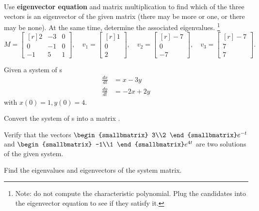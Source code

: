      \begin{question}
      Use \textbf{eigenvector equation} and matrix multiplication to find which of the three vectors is an eigenvector of the given matrix (there may be more or one, or there may be none). At the same time, determine the associated eigenvalues. \footnote{Note: do not compute the characteristic polynomial. Plug the candidates into the eigenvector equation to see if they satisfy it.}
      \begin{equation*}
      M = \begin{bmatrix*}[r]
        2 & -3 & 0 \\
        0 & -1 & 0 \\
        -1 & 5 & 1
      \end{bmatrix*},\quad
      v_{1} = \begin{bmatrix*}[r]
        1 \\ 0 \\ 2
      \end{bmatrix*}, \quad
      v_{2} = \begin{bmatrix*}[r]
        -7 \\ 0 \\ -7
      \end{bmatrix*}, \quad
      v_{3} = \begin{bmatrix*}[r]
        -7 \\ 7 \\ 7
      \end{bmatrix*}.
      \end{equation*}
      \end{question}

      \begin{question}
      Given a system of \ode{}s
      \begin{align*}
      \frac{dx}{dt} & = x-3y\\
      \frac{dy}{dt} & = -2x+2y
      \end{align*}
      with $x(0) = 1, y(0)= 4.$

      \begin{compactenum}[(i)]
      \item Convert the system of \ode{}s into a matrix \ode{}.
      \item Verify that the vectors $
        \begin{smallbmatrix}
          3\\2
        \end{smallbmatrix}
      e^{-t}$ and $
      \begin{smallbmatrix}
      -1\\1
      \end{smallbmatrix}
      e^{4t}$ are two solutions of the given system.

      \item Find the eigenvalues and eigenvectors of the system matrix.
      \end{compactenum}
      \end{question}

